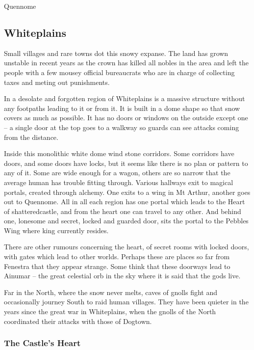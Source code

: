\begin{multicols}{2}
\begin{encounters}{Quennome}
\end{encounters}

\subsection{Whiteplains}


Small villages and rare towns dot this snowy expanse.  The land has grown unstable in recent years as the crown has killed all nobles in the area and left the people with a few mousey official bureaucrats who are in charge of collecting taxes and meting out punishments.

In a desolate and forgotten region of Whiteplains is a massive structure without any footpaths leading to it or from it.
It is built in a dome shape so that snow covers as much as possible.
It has no doors or windows on the outside except one -- a single door at the top goes to a walkway so guards can see attacks coming from the distance.

Inside this monolithic white dome wind stone corridors.
Some corridors have doors, and some doors have locks, but it seems like there is no plan or pattern to any of it.
Some are wide enough for a wagon, others are so narrow that the average human has trouble fitting through.
Various hallways exit to magical portals, created through alchemy.
One exits to a wing in Mt Arthur, another goes out to Quennome.
All in all each region has one portal which leads to the Heart of \gls{shatteredcastle}, and from the heart one can travel to any other.
And behind one, lonesome and secret, locked and guarded door, sits the portal to the Pebbles Wing where \gls{king} currently resides.

There are other rumours concerning the heart, of secret rooms with locked doors, with gates which lead to other worlds.  Perhaps these are places so far from Fenestra that they appear strange.  Some think that these doorways lead to Ainumar -- the great celestial orb in the sky where it is said that the gods live.

Far in the North, where the snow never melts, caves of gnolls fight and occasionally journey South to raid human villages.  They have been quieter in the years since the great war in Whiteplains, when the gnolls of the North coordinated their attacks with those of Dogtown.

\subsubsection{The Castle's Heart}\label{whiteland_heart}


\end{multicols}
